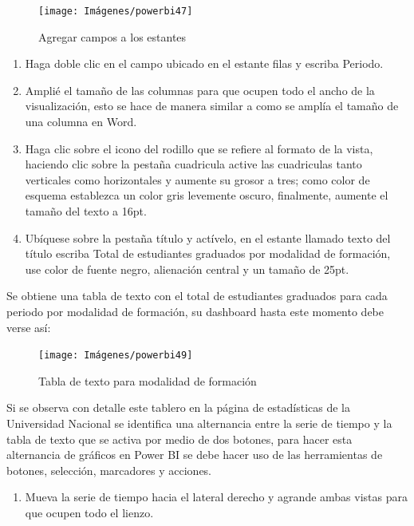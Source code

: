 \documentclass[
]{book}
\providecommand{\tightlist}{%
  \setlength{\itemsep}{0pt}\setlength{\parskip}{0pt}}
\begin{document}
\begin{figure}

{\centering \texttt{[image: Imágenes/powerbi47]} 

}

\caption{Agregar campos a los estantes}\label{fig:paso2matriz-fig}
\end{figure}

\begin{enumerate}
\def\labelenumi{\arabic{enumi}.}
\setcounter{enumi}{2}
\item
  Haga doble clic en el campo ubicado en el estante filas y escriba Periodo.
\item
  Amplié el tamaño de las columnas para que ocupen todo el ancho de la visualización, esto se hace de manera similar a como se amplía el tamaño de una columna en Word.
\item
  Haga clic sobre el icono del rodillo que se refiere al formato de la vista, haciendo clic sobre la pestaña cuadricula active las cuadriculas tanto verticales como horizontales y aumente su grosor a tres; como color de esquema establezca un color gris levemente oscuro, finalmente, aumente el tamaño del texto a 16pt.
\item
  Ubíquese sobre la pestaña título y actívelo, en el estante llamado texto del título escriba Total de estudiantes graduados por modalidad de formación, use color de fuente negro, alienación central y un tamaño de 25pt.
\end{enumerate}

Se obtiene una tabla de texto con el total de estudiantes graduados para cada periodo por modalidad de formación, su dashboard hasta este momento debe verse así:

\begin{figure}

{\centering \texttt{[image: Imágenes/powerbi49]} 

}

\caption{Tabla de texto para modalidad de formación}\label{fig:paso6matriz-fig}
\end{figure}

Si se observa con detalle este tablero en la página de estadísticas de la Universidad Nacional se identifica una alternancia entre la serie de tiempo y la tabla de texto que se activa por medio de dos botones, para hacer esta alternancia de gráficos en Power BI se debe hacer uso de las herramientas de botones, selección, marcadores y acciones.

\begin{enumerate}
\def\labelenumi{\arabic{enumi}.}
\tightlist
\item
  Mueva la serie de tiempo hacia el lateral derecho y agrande ambas vistas para que ocupen todo el lienzo.
\end{enumerate}
\end{document}

